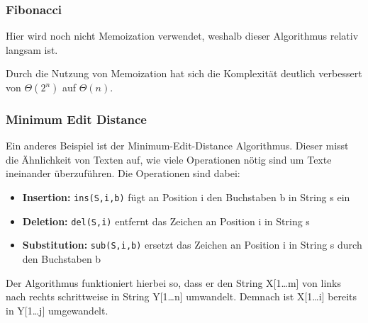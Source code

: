 \documentclass[
../../AuD-Zusammenfassung.tex,
]
{subfiles}
\begin{document}
\subsubsection{Fibonacci}
\begin{algorithm}[H]
\end{algorithm}
Hier wird noch nicht Memoization verwendet, weshalb dieser Algorithmus relativ langsam ist.\\
\begin{algorithm}[H]
\end{algorithm}
Durch die Nutzung von Memoization hat sich die Komplexität deutlich verbessert von $\Theta(2^n)$ auf $\Theta(n)$.
\newpage
\subsubsection{Minimum Edit Distance}
Ein anderes Beispiel ist der Minimum-Edit-Distance Algorithmus. Dieser misst die Ähnlichkeit von Texten auf, wie viele Operationen nötig sind um Texte ineinander überzuführen. Die Operationen sind dabei:
\begin{itemize}
    \item \textbf{Insertion:} \texttt{ins(S,i,b)} fügt an Position i den Buchstaben b in String s ein
    \item \textbf{Deletion:} \texttt{del(S,i)} entfernt das Zeichen an Position i in String s
    \item \textbf{Substitution:} \texttt{sub(S,i,b)} ersetzt das Zeichen an Position i in String s durch den Buchstaben b
\end{itemize}
Der Algorithmus funktioniert hierbei so, dass er den String X[1\dots m] von links nach rechts schrittweise in String Y[1\dots n] umwandelt. Demnach ist X[1\dots i] bereits in Y[1\dots j] umgewandelt.
\end{document}
